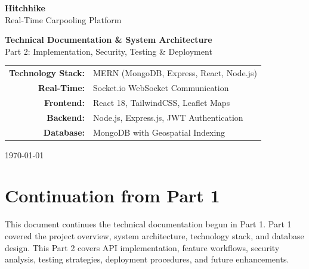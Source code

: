 \documentclass[12pt,a4paper]{article}
\begin{document}
\begin{titlepage}
    \centering
    \vspace*{2cm}
    
    {\Huge\bfseries Hitchhike\\[0.5cm]}
    {\LARGE Real-Time Carpooling Platform\\[0.2cm]}
    \vspace{1cm}
    
    {\Large\textbf{Technical Documentation \& System Architecture}\\[0.5cm]}
    {\large Part 2: Implementation, Security, Testing \& Deployment\\[2cm]}
    
    \vspace{1.5cm}
    
    \begin{tabular}{rl}
        \textbf{Technology Stack:} & MERN (MongoDB, Express, React, Node.js) \\[0.3cm]
        \textbf{Real-Time:} & Socket.io WebSocket Communication \\[0.3cm]
        \textbf{Frontend:} & React 18, TailwindCSS, Leaflet Maps \\[0.3cm]
        \textbf{Backend:} & Node.js, Express.js, JWT Authentication \\[0.3cm]
        \textbf{Database:} & MongoDB with Geospatial Indexing \\[0.3cm]
    \end{tabular}
    
    \vfill
    
    {\large \today\\[2cm]}
    
\end{titlepage}

\tableofcontents
\newpage

\section*{Continuation from Part 1}

This document continues the technical documentation begun in Part 1. Part 1 covered the project overview, system architecture, technology stack, and database design. This Part 2 covers API implementation, feature workflows, security analysis, testing strategies, deployment procedures, and future enhancements.

\vspace{1cm}
\end{document}
